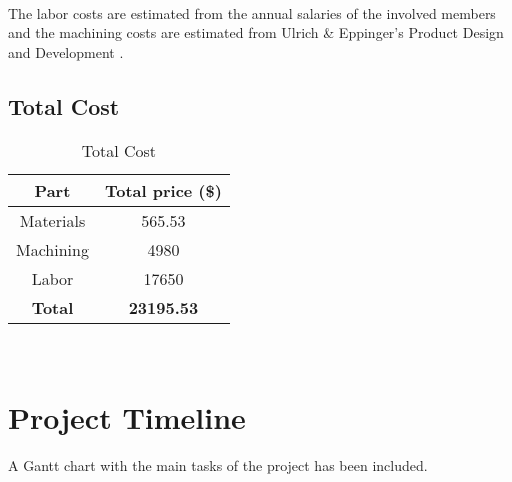 \newline
\\
The labor costs are estimated from the annual salaries of the involved members and the machining costs are estimated from Ulrich \& Eppinger's Product Design and Development \cite{ulrich2004product}.

\subsection{Total Cost}

\begin{table}[h]
\centering
\begin{tabular}{cc}
		\hline
		\textbf{Part}      & \textbf{Total price (\$)} \\
		\hline
		Materials & 565.53           \\
		Machining & 4980             \\
		Labor     & 17650            \\
		\hline
		\textbf{Total}     & \textbf{23195.53}     \\
		\hline   
	\end{tabular}
\caption{Total Cost}
\\[30pt]
\end{table}

\section{Project Timeline}

A Gantt chart with the main tasks of the project has been included.


